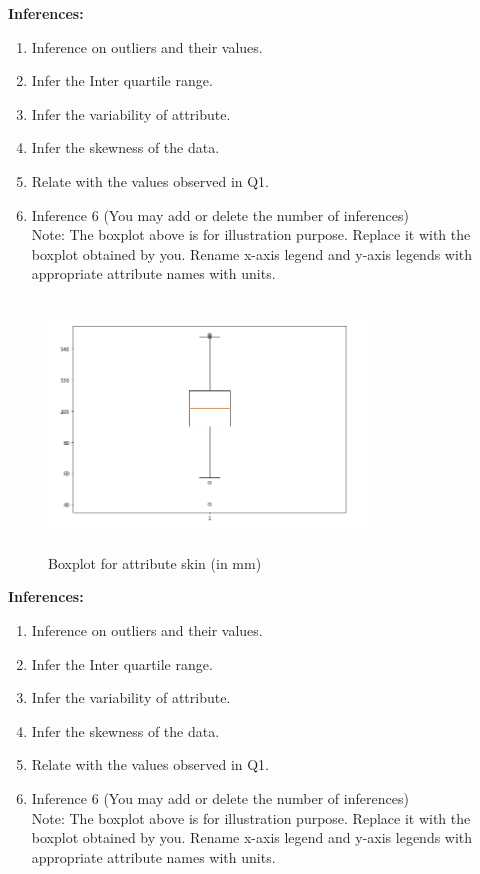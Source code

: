 \documentclass[12 pt, a4paper]{article}
\theoremstyle{definition}
\begin{document}
\textbf{\Large Inferences:}
\begin{enumerate}
   \item Inference on outliers and their values.
   \item Infer the Inter quartile range.
   \item Infer the variability of attribute.
   \item Infer the skewness of the data.
 \item Relate with the values observed in Q1. \item Inference 6 (You may add or delete the number of inferences)
\\Note: The boxplot above is for illustration purpose. Replace it with the boxplot obtained by you. Rename x-axis legend and y-axis legends with appropriate attribute names with units.

\end{enumerate}

\begin{figure}[H]
	\centering
	\includegraphics[width=8.5cm,height=6.65cm]{boxplot.png}
	\caption{Boxplot for attribute skin (in mm)}
	\label{Blockdia}
\end{figure}

\textbf{\Large Inferences:}
\begin{enumerate}
   \item Inference on outliers and their values.
   \item Infer the Inter quartile range.
   \item Infer the variability of attribute.
   \item Infer the skewness of the data.
 \item Relate with the values observed in Q1. \item Inference 6 (You may add or delete the number of inferences)
\\Note: The boxplot above is for illustration purpose. Replace it with the boxplot obtained by you. Rename x-axis legend and y-axis legends with appropriate attribute names with units.

\end{enumerate}
\end{document}
